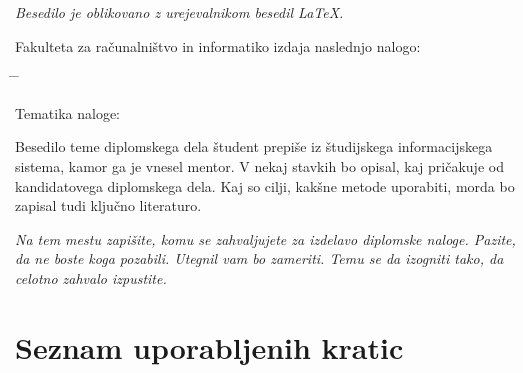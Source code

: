 \documentclass[a4paper, 12p]{book}
\newcommand{\clearemptydoublepage}{\newpage{\pagestyle{empty}\cleardoublepage}}
\begin{document}
\begin{center}
\mbox{}\vfill
\emph{Besedilo je oblikovano z urejevalnikom besedil \LaTeX.}
\end{center}
\clearemptydoublepage

\thispagestyle{empty}
\vspace*{4cm}

\noindent
Fakulteta za računalništvo in informatiko izdaja naslednjo nalogo:
\medskip
\begin{tabbing}
\hspace{32mm}\= \hspace{6cm} \= \kill




Tematika naloge:
\end{tabbing}
Besedilo teme diplomskega dela študent prepiše iz študijskega informacijskega sistema, kamor ga je vnesel mentor. V nekaj stavkih bo opisal, kaj pričakuje od kandidatovega diplomskega dela. Kaj so cilji, kakšne metode uporabiti, morda bo zapisal tudi ključno literaturo.
\vspace{15mm}






\vspace{2cm}

\clearemptydoublepage

\thispagestyle{empty}\mbox{}\vfill\null\it%
\noindent
Na tem mestu zapišite, komu se zahvaljujete za izdelavo diplomske naloge. Pazite, da ne boste koga pozabili. Utegnil vam bo zameriti. Temu se da izogniti tako, da celotno zahvalo izpustite.
\rm\normalfont

\clearemptydoublepage

\pagestyle{empty}
\def\thepage{}%
\tableofcontents{}


\clearemptydoublepage


\chapter*{Seznam uporabljenih kratic}  %
\end{document}
